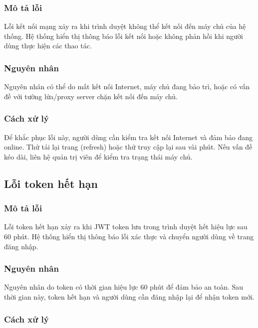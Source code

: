 \subsubsection{Mô tả lỗi}

Lỗi kết nối mạng xảy ra khi trình duyệt không thể kết nối đến máy chủ của hệ thống. Hệ thống hiển thị thông báo lỗi kết nối hoặc không phản hồi khi người dùng thực hiện các thao tác.

\subsubsection{Nguyên nhân}

Nguyên nhân có thể do mất kết nối Internet, máy chủ đang bảo trì, hoặc có vấn đề với tường lửa/proxy server chặn kết nối đến máy chủ.

\subsubsection{Cách xử lý}

Để khắc phục lỗi này, người dùng cần kiểm tra kết nối Internet và đảm bảo đang online. Thử tải lại trang (refresh) hoặc thử truy cập lại sau vài phút. Nếu vấn đề kéo dài, liên hệ quản trị viên để kiểm tra trạng thái máy chủ.

\subsection{Lỗi token hết hạn}

\subsubsection{Mô tả lỗi}

Lỗi token hết hạn xảy ra khi JWT token lưu trong trình duyệt hết hiệu lực sau 60 phút. Hệ thống hiển thị thông báo lỗi xác thực và chuyển người dùng về trang đăng nhập.

\subsubsection{Nguyên nhân}

Nguyên nhân do token có thời gian hiệu lực 60 phút để đảm bảo an toàn. Sau thời gian này, token hết hạn và người dùng cần đăng nhập lại để nhận token mới.

\subsubsection{Cách xử lý}

